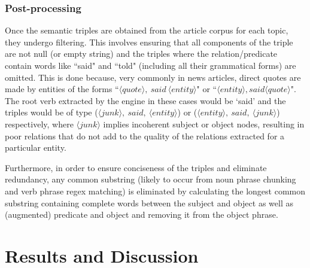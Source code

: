 \subsubsection{Post-processing}
Once the semantic triples are obtained from the article corpus for each topic, they undergo filtering. This involves ensuring that all components of the triple are not null (or empty string) and the triples where the relation/predicate contain words like ``said" and ``told" (including all their grammatical forms) are omitted. This is done because, very commonly in news articles, direct quotes are made by entities of the forms ``$\langle quote \rangle, \ said \ \langle entity \rangle$" or ``$ \langle entity \rangle, said \big \langle quote \rangle$". The root verb extracted by the engine in these cases would be `said' and the triples would be of type ($\langle junk \rangle, \ said, \ \langle entity \rangle$) or ($\langle entity \rangle, \ said, \ \langle junk \rangle$) respectively, where $\langle junk \rangle$ implies incoherent subject or object nodes, resulting in poor relations that do not add to the quality of the relations extracted for a particular entity. 

Furthermore, in order to ensure conciseness of the triples and eliminate redundancy, any common substring (likely to occur from noun phrase chunking and verb phrase regex matching) is eliminated by calculating the longest common substring containing complete words between the subject and object as well as (augmented) predicate and object and removing it from the object phrase. 


\section{Results and Discussion}


